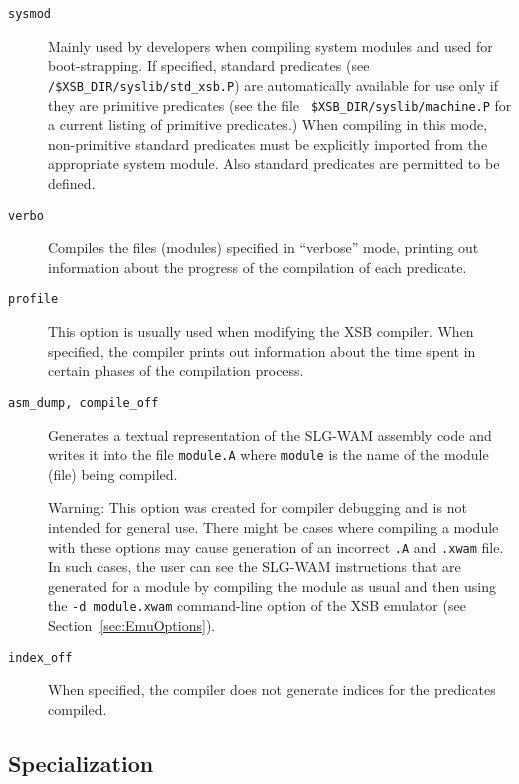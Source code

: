 \begin{description}
\item[{\tt sysmod}]  
%
Mainly used by developers when compiling system modules and used for
boot-strapping. If specified, standard predicates (see {\tt
  /\$XSB\_DIR/syslib/std\_xsb.P}) are automatically available for use
only if they are primitive predicates (see the file {\tt
  \$XSB\_DIR/syslib/machine.P} for a current listing of primitive
predicates.)  When compiling in this mode, non-primitive standard
predicates must be explicitly imported from the appropriate system
module.  Also standard predicates are permitted to be defined.
%
\item[{\tt verbo}] Compiles the files (modules) specified in ``verbose'' mode, 
	printing out information about the progress of the compilation of each 
	predicate.
%
\item[{\tt profile}] This option is usually used when modifying the
  XSB compiler.  When specified, the compiler prints out information
  about the time spent in certain phases of the compilation process.
%
\item[{\tt asm\_dump, compile\_off}] Generates a textual representation of 
	the SLG-WAM assembly code and writes it into the file {\tt module.A}
	where {\tt module} is the name of the module (file) being compiled.  
	
	{\sc Warning:} This option was created for compiler debugging and is
		not intended for general use.  There might be cases where
		compiling a module with these options may cause generation
		of an incorrect {\tt .A} and {\tt .xwam} file.  In such cases,
		the user can see the SLG-WAM instructions that are
		generated for a module by compiling the module as usual and
		then using the {\tt -d module.xwam} command-line
		option of the 
		XSB emulator (see Section~\ref{sec:EmuOptions}).
\item[{\tt index\_off}] When specified, the compiler does not generate indices
	for the predicates compiled.  
\end{description}


\subsection{Specialization}\label{specialization}

